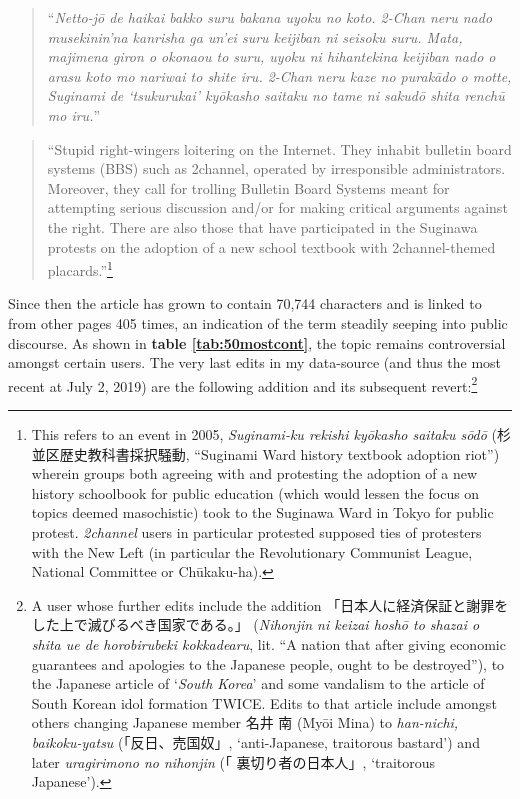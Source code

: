 \documentclass[10pt,british,A4paper,,openany]{memoir}
\begin{document}
\begin{quote}
``\emph{Netto-jō de haikai bakko suru bakana uyoku no koto. 2-Chan neru
nado musekinin'na kanrisha ga un'ei suru keijiban ni seisoku suru. Mata,
majimena giron o okonaou to suru, uyoku ni hihantekina keijiban nado o
arasu koto mo nariwai to shite iru. 2-Chan neru kaze no purakādo o
motte, Suginami de `tsukurukai' kyōkasho saitaku no tame ni sakudō shita
renchū mo iru.}''
\end{quote}

\begin{quote}
``Stupid right-wingers loitering on the Internet. They inhabit bulletin
board systems (BBS) such as 2channel, operated by irresponsible
administrators. Moreover, they call for trolling Bulletin Board Systems
meant for attempting serious discussion and/or for making critical
arguments against the right. There are also those that have participated
in the Suginawa protests on the adoption of a new school textbook with
2channel-themed placards.''\footnote{This refers to an event in 2005,
  \emph{Suginami-ku rekishi kyōkasho saitaku sōdō}
  (杉並区歴史教科書採択騒動, ``Suginami Ward history textbook adoption
  riot'') wherein groups both agreeing with and protesting the adoption
  of a new history schoolbook for public education (which would lessen
  the focus on topics deemed masochistic) took to the Suginawa Ward in
  Tokyo for public protest. \emph{2channel} users in particular
  protested supposed ties of protesters with the New Left (in particular
  the Revolutionary Communist League, National Committee or Chūkaku-ha).}
\end{quote}

Since then the article has grown to contain 70,744 characters and is
linked to from other pages 405 times, an indication of the term steadily
seeping into public discourse. As shown in \textbf{table
\ref{tab:50mostcont}}, the topic remains controversial amongst certain
users. The very last edits in my data-source (and thus the most recent
at July 2, 2019) are the following addition and its subsequent
revert:\footnote{A user whose further edits include the addition
  「日本人に経済保証と謝罪をした上で滅びるべき国家である。」
  (\emph{Nihonjin ni keizai hoshō to shazai o shita ue de horobirubeki
  kokkadearu}, lit. ``A nation that after giving economic guarantees and
  apologies to the Japanese people, ought to be destroyed''), to the
  Japanese article of `\emph{South Korea}' and some vandalism to the
  article of South Korean idol formation TWICE. Edits to that article
  include amongst others changing Japanese member 名井 南 (Myōi Mina) to
  \emph{han-nichi, baikoku-yatsu} (「反日、売国奴」, `anti-Japanese,
  traitorous bastard') and later \emph{uragirimono no nihonjin} (「
  裏切り者の日本人」, `traitorous Japanese').}
\end{document}
